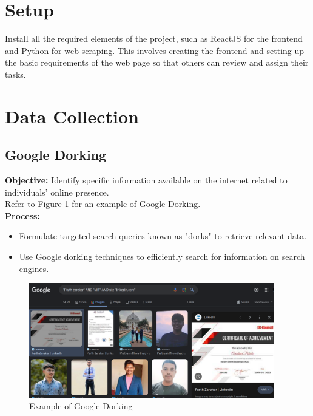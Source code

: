 \documentclass[openany]{report}
\begin{document}
\section{Setup}
Install all the required elements of the project, such as ReactJS for the frontend and Python for web scraping. This involves creating the frontend and setting up the basic requirements of the web page so that others can review and assign their tasks.

\section{Data Collection}
\subsection{Google Dorking}
\textbf{Objective:} Identify specific information available on the internet related to individuals' online presence.\\ Refer to Figure \ref{fig:gdorking} for an example of Google Dorking.\\
\textbf{Process:}
\begin{itemize}
    \item Formulate targeted search queries known as "dorks" to retrieve relevant data.
    \item Use Google dorking techniques to efficiently search for information on search engines.
\end{itemize}

\begin{figure}
    \begin{small}
        \begin{center}
            \includegraphics[width=0.95\textwidth]{gdorking.png}
        \end{center}
        \caption{Example of Google Dorking}
        \label{fig:gdorking}
    \end{small}
\end{figure}
\end{document}
